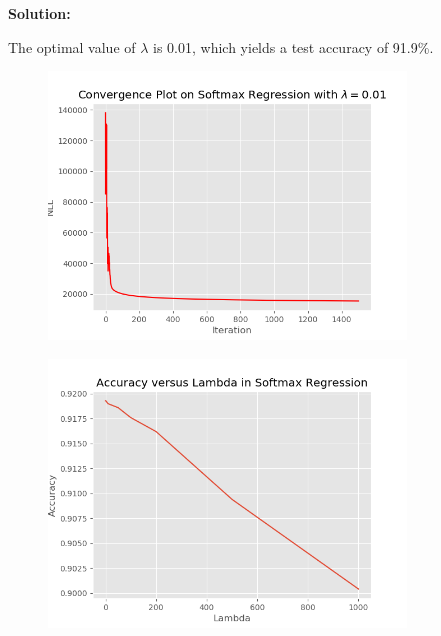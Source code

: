 \documentclass[letter,11pt]{article}
\newenvironment{solution}{
    \vspace{0.16in} {\bf Solution:}
    
}{
	\vspace{0.16in}
}
\begin{document}
\begin{enumerate}
\begin{enumerate}[label=(\alph*)]
        \begin{solution}
            The optimal value of $\lambda$ is 0.01, which yields a test accuracy
            of 91.9\%.

            \begin{figure}[H]
                \centering
                \includegraphics[width=9.5cm]{hw4pr2b_convergence.png}
            \end{figure}
            \begin{figure}[H]
                \centering
                \includegraphics[width=9.5cm]{hw4pr2b_lva.png}
            \end{figure}
        \end{solution}
    \end{enumerate}
\end{enumerate}
\end{document}
